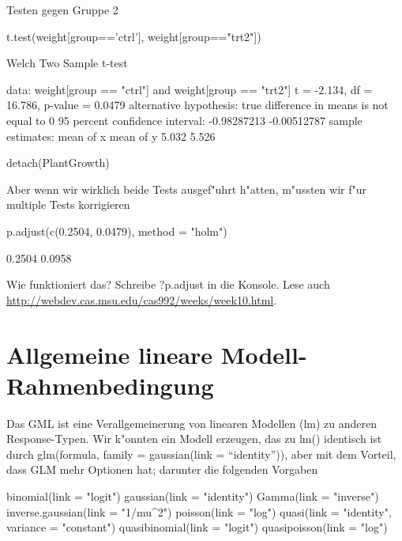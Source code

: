 \documentclass[a4paper,twoside]{tufte-book}\usepackage[]{graphicx}\usepackage[]{color}
\begin{document}
\begin{appendices}
Testen gegen Gruppe 2

\begin{Schunk}
\begin{Sinput}
t.test(weight[group=='ctrl'], weight[group=="trt2"])
\end{Sinput}
\begin{Soutput}

	Welch Two Sample t-test

data:  weight[group == "ctrl"] and weight[group == "trt2"]
t = -2.134, df = 16.786, p-value = 0.0479
alternative hypothesis: true difference in means is not equal to 0
95 percent confidence interval:
 -0.98287213 -0.00512787
sample estimates:
mean of x mean of y 
    5.032     5.526 
\end{Soutput}
\begin{Sinput}
detach(PlantGrowth)
\end{Sinput}
\end{Schunk}

Aber wenn wir wirklich beide Tests ausgef"uhrt h"atten, m"ussten wir f"ur multiple Tests korrigieren

\begin{Schunk}
\begin{Sinput}
p.adjust(c(0.2504, 0.0479), method = "holm")
\end{Sinput}
\begin{Soutput}
[1] 0.2504 0.0958
\end{Soutput}
\end{Schunk}

Wie funktioniert das? Schreibe ?p.adjust in die Konsole. Lese auch \href{das hier}{http://webdev.cas.msu.edu/cas992/weeks/week10.html}.

\section{Allgemeine lineare Modell-Rahmenbedingung}

Das GML ist eine Verallgemeinerung von linearen Modellen (lm) zu anderen Response-Typen. Wir k"onnten ein Modell erzeugen, das zu lm() identisch ist durch glm(formula, family = gaussian(link = "`identity"')), aber mit dem Vorteil, dass GLM mehr Optionen hat; darunter die folgenden Vorgaben

\begin{Schunk}
\begin{Sinput}
binomial(link = "logit")
gaussian(link = "identity")
Gamma(link = "inverse")
inverse.gaussian(link = "1/mu^2")
poisson(link = "log")
quasi(link = "identity", variance = "constant")
quasibinomial(link = "logit")
quasipoisson(link = "log")
\end{Sinput}
\end{Schunk}


\end{appendices}
\end{document}
